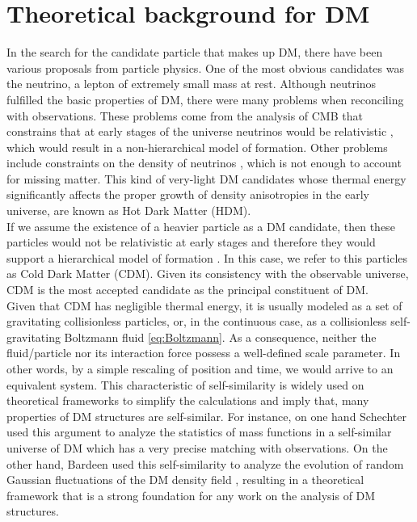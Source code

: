\section{Theoretical background for DM}
In the search for the candidate particle that makes up DM, there have been various proposals from particle physics. One of the most obvious candidates was the neutrino, a lepton of extremely small mass at rest. Although neutrinos fulfilled the basic properties of DM, there were many problems when reconciling with observations. These problems come from the analysis of CMB that constrains that at early stages of the universe neutrinos would be relativistic \cite{Bond_et_al._1980,Bertone_et_al._2005}, which would result in a non-hierarchical model of formation. Other problems include constraints on the density of neutrinos \cite{WMAP_2003}, which is not enough to account for missing matter. This kind of very-light DM candidates whose thermal energy significantly affects the proper growth of density anisotropies in the early universe, are known as Hot Dark Matter (HDM).\\

If we assume the existence of a heavier particle as a DM candidate, then these particles would not be relativistic at early stages and therefore they would support a hierarchical model of formation \cite{Blumenthal_et_al._1984,Liddle_and_Lith_1993}. In this case, we refer to this particles as Cold Dark Matter (CDM). Given its consistency with the observable universe, CDM is the most accepted candidate as the principal constituent of DM.\\

Given that CDM has negligible thermal energy, it is usually modeled as a set of gravitating collisionless particles, or, in the continuous case, as a collisionless self-gravitating Boltzmann fluid \eqref{eq:Boltzmann}. As a consequence, neither the fluid/particle nor its interaction force possess a well-defined scale parameter. In other words, by a simple rescaling of position and time, we would arrive to an equivalent system. This characteristic of self-similarity is widely used on theoretical frameworks to simplify the calculations and imply that, many properties of DM structures are self-similar. For instance, on one hand Schechter used this argument to analyze the statistics of mass functions in a self-similar universe of DM \cite{Schechter_1976} which has a very precise matching with observations. On the other hand, Bardeen used this self-similarity to analyze the evolution of random Gaussian fluctuations of the DM density field \cite{Bardeen_1986}, resulting in a theoretical framework that is a strong foundation for any work on the analysis of DM structures.\\


